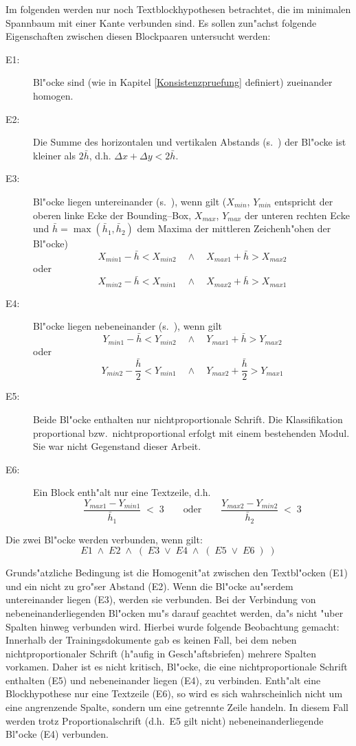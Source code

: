 Im folgenden werden nur noch Textblockhypothesen betrachtet, die im minimalen Spannbaum
mit einer Kante verbunden sind. Es sollen zun"achst folgende Eigenschaften zwischen diesen Blockpaaren untersucht werden:
\begin{description}
  \item[E1:]Bl"ocke sind (wie in Kapitel \ref{Konsistenzpruefung} definiert) zueinander homogen.
  \item[E2:]Die Summe des horizontalen und vertikalen Abstands (s.\ )
  der Bl"ocke ist kleiner als $2\bar{h}$, d.h. $\Delta x + \Delta y < 2 \bar{h}$.
  \item[E3:]Bl"ocke liegen untereinander (s.\ ), wenn gilt
  ($X_{min}$, $Y_{min}$ entspricht der oberen linke Ecke der Bounding--Box, $X_{max}$, $Y_{max}$
  der unteren rechten Ecke und $\bar{h} = \max(\bar{h}_1,\bar{h}_2)$
  dem Maxima der mittleren Zeichenh"ohen der Bl"ocke)
  $$X_{min1} - \bar{h} < X_{min2}\quad\wedge\quad X_{max1} + \bar{h} > X_{max2}$$
  oder
  $$X_{min2} - \bar{h} < X_{min1}\quad\wedge\quad X_{max2} + \bar{h} > X_{max1}$$

  \item[E4:]Bl"ocke liegen nebeneinander (s.\ ), wenn gilt
  $$Y_{min1} - \bar{h} < Y_{min2}\quad\wedge\quad Y_{max1} + \bar{h} > Y_{max2}$$
  oder
  $$Y_{min2} - \frac{\bar{h}}{2} < Y_{min1}\quad\wedge\quad Y_{max2} + \frac{\bar{h}}{2} > Y_{max1}$$

  \item[E5:]Beide Bl"ocke enthalten nur nichtproportionale Schrift. Die Klassifikation proportional
  bzw.\ nichtproportional erfolgt mit einem bestehenden Modul. Sie war nicht Gegenstand dieser Arbeit.
  \item[E6:]Ein Block enth"alt nur eine Textzeile, d.h.
  $$\frac{Y_{max1} - Y_{min1}}{\bar{h}_1} \; < \;3 \qquad\mbox{oder}\qquad
    \frac{Y_{max2} - Y_{min2}}{\bar{h}_2} \; < \;3$$
\end{description}


Die zwei Bl"ocke werden verbunden, wenn gilt:
$$E1 \; \wedge \; E2 \; \wedge \; ( \; E3 \; \vee \; E4 \; \wedge \; ( \; E5 \; \vee \; E6 \; )\;)$$

Grunds"atzliche Bedingung ist die Homogenit"at zwischen den Textbl"ocken (E1) und ein nicht zu gro"ser
Abstand (E2). Wenn die Bl"ocke au"serdem untereinander liegen (E3), werden sie verbunden.
Bei der Verbindung von nebeneinanderliegenden Bl"ocken mu"s darauf geachtet werden, da"s nicht "uber Spalten hinweg verbunden wird.
Hierbei wurde folgende Beobachtung gemacht: Innerhalb der Trainingsdokumente gab es keinen
Fall, bei dem neben nichtproportionaler Schrift (h"aufig in Gesch"aftsbriefen) mehrere
Spalten vorkamen.  Daher ist es nicht kritisch, Bl"ocke, die eine nichtproportionale Schrift
enthalten (E5) und nebeneinander liegen (E4), zu verbinden.
Enth"alt eine Blockhypothese nur eine Textzeile (E6), so wird es sich wahrscheinlich nicht
um eine angrenzende Spalte, sondern um eine getrennte Zeile handeln. In diesem Fall werden
trotz Proportionalschrift (d.h.\ E5 gilt nicht) nebeneinanderliegende Bl"ocke (E4) verbunden.

